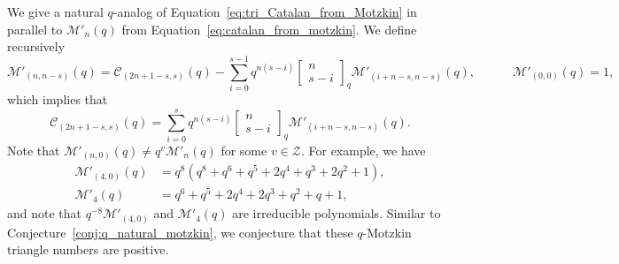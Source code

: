 \documentclass[11pt, leqno]{amsart}
\theoremstyle{plain}
\theoremstyle{definition}
\numberwithin{equation}{section}
\newcommand{\fw}{\varpi} %
\newcommand{\Cat}{\mathcal{C}} %
\newcommand{\Mot}{\mathcal{M}} %
\newcommand{\qbinom}[3]{\left[ \begin{matrix} #1 \\ #2 \end{matrix} \right]_{#3}} %
\newcommand{\ps}{\operatorname{ps}} %
\newcommand{\nps}{\widetilde{\ps}} %
\def\ZZ{\mathcal Z}
\begin{document}
%


We give a natural $q$-analog of Equation~\eqref{eq:tri_Catalan_from_Motzkin} in parallel to $\Mot'_n(q)$ from Equation~\eqref{eq:catalan_from_motzkin}.
We define recursively
\[
\Mot'_{(n,n-s)}(q) = \Cat_{(2n+1-s,s)}(q) - \sum_{i=0}^{s-1} q^{n(s-i)} \qbinom{n}{s-i}{q} \Mot'_{(i+n-s,n-s)}(q),
\qquad\quad
\Mot'_{(0,0)}(q) = 1,
\]
which implies that
\[
\Cat_{(2n+1-s,s)}(q) = \sum_{i=0}^s q^{n(s-i)} \qbinom{n}{s-i}{q} \Mot'_{(i+n-s,n-s)}(q).
\]
Note that $\Mot'_{(n,0)}(q) \neq q^v \Mot'_n(q)$ for some $v \in \ZZ$. For example, we have
\begin{align*}
\Mot'_{(4,0)}(q) & = q^8 \left( q^8 + q^6 + q^5 + 2 q^4 + q^3 + 2 q^2 + 1 \right),
\\ \Mot'_4(q) & = q^6 + q^5 + 2 q^4 + 2 q^3 + q^2 + q + 1,
\end{align*}
and note that $q^{-8} \Mot'_{(4,0)}$ and $\Mot'_4(q)$ are irreducible polynomials.
Similar to Conjecture~\ref{conj:q_natural_motzkin}, we conjecture that these $q$-Motzkin triangle numbers are positive.
\end{document}
